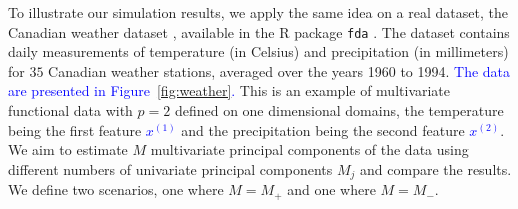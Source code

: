 To illustrate our simulation results, we apply the same idea on a real dataset, the Canadian weather dataset \citep{ramsayFunctionalDataAnalysis2005}, available in the \textsf{R} package \texttt{fda} \citep{ramsayFdaFunctionalData2023}. The dataset contains daily measurements of temperature (in Celsius) and precipitation (in millimeters) for $35$ Canadian weather stations, averaged over the years 1960 to 1994. \textcolor{blue}{The data are presented in Figure~\ref{fig:weather}.} This is an example of multivariate functional data with $p = 2$ defined on one dimensional domains, the temperature being the first feature \textcolor{blue}{$x^{(1)}$} and the precipitation being the second feature \textcolor{blue}{$x^{(2)}$}. We aim to estimate $M$ multivariate principal components of the data using different numbers of univariate principal components $M_j$ and compare the results. We define two scenarios, one where $M = M_{+}$ and one where $M = M_{-}$.
